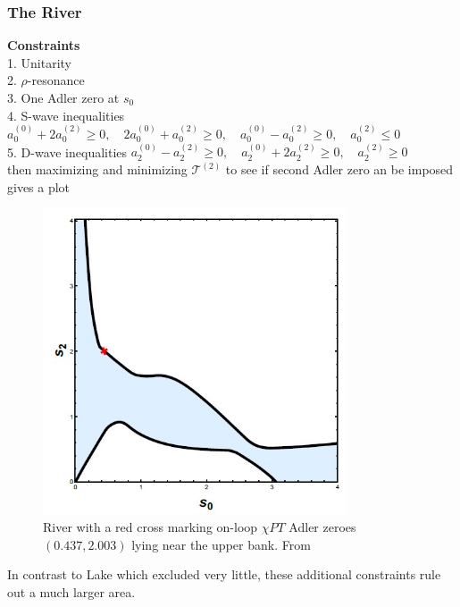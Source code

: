 ﻿\documentclass[12pt,a4paper]{article}
\begin{document}
\subsubsection{The River}
\textbf{Constraints}\\
1. Unitarity\\
2. $\rho$-resonance\\
3. One Adler zero at    $s_{0}$\\
4. S-wave inequalities    $a_{0}^{(0)}+2 a_{0}^{(2)} \geq 0, \quad 2 a_{0}^{(0)}+a_{0}^{(2)} \geq 0, \quad a_{0}^{(0)}-a_{0}^{(2)} \geq 0, \quad a_{0}^{(2)} \leq 0$\\
5. D-wave inequalities $a_{2}^{(0)}-a_{2}^{(2)} \geq 0, \quad a_{2}^{(0)}+2 a_{2}^{(2)} \geq 0, \quad a_{2}^{(2)} \geq 0$\\
then maximizing and minimizing $\mathcal{T}^{(2)}$ to see if second Adler zero an be imposed gives a plot \cite{7}
\begin{figure}[H]
  \centering
  \includegraphics[width=9cm]{11.jpg}
  \caption{River with a red cross marking on-loop $\chi PT$ Adler zeroes $(0.437, 2.003)$ lying near the upper bank. From \cite{7}}
  \label{fig:1}
\end{figure}
In contrast to Lake which excluded very little, these additional constraints rule out a much larger area.
\end{document}

